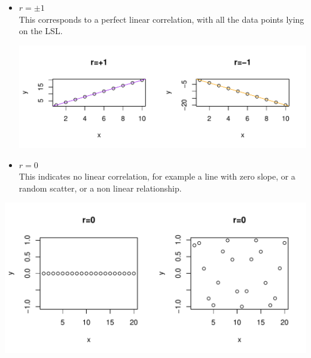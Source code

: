 \documentclass[t,xcolor=pdftex,dvipsnames,table]{beamer}\usepackage[]{graphicx}\usepackage[]{color}
\makeatletter
\def\maxwidth{ %
  \ifdim\Gin@nat@width>\linewidth
    \linewidth
  \else
    \Gin@nat@width
  \fi
}
\newenvironment{knitrout}{}{} %
\makeatother
\begin{document}
\begin{frame}[fragile]{}
\begin{itemize}
\item  $r=\pm 1$ \\
This corresponds to a perfect linear correlation, with all the data points lying on the LSL.

\begin{knitrout}
\color{fgcolor}
\includegraphics[width=\maxwidth]{figure/unnamed-chunk-50-1} 

\end{knitrout}
\end{itemize}
\end{frame} 

\begin{frame}[fragile]{}
\begin{itemize}
\item $r=0 $ \\
This indicates no linear correlation, for example a line with zero slope, or a random scatter, or a non linear relationship.
\end{itemize}
\begin{knitrout}
\color{fgcolor}
\includegraphics[width=\maxwidth]{figure/unnamed-chunk-51-1} 

\end{knitrout}
\end{frame} 
\end{document}
